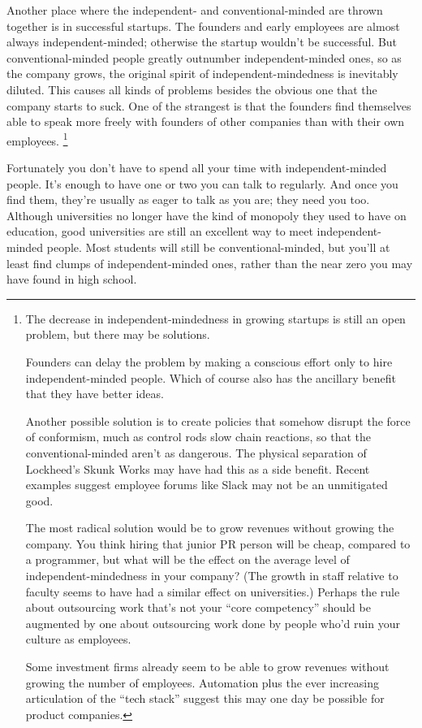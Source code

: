 \documentclass[12pt]{book}
\begin{document}
Another place where the independent- and conventional-minded are thrown
together is in successful startups. The founders and early employees are
almost always independent-minded; otherwise the startup wouldn't be
successful. But conventional-minded people greatly outnumber
independent-minded ones, so as the company grows, the original spirit of
independent-mindedness is inevitably diluted. This causes all kinds of
problems besides the obvious one that the company starts to suck. One of
the strangest is that the founders find themselves able to speak more
freely with founders of other companies than with their own employees.
\footnote{The decrease in independent-mindedness in growing startups is
still an open problem, but there may be solutions.

Founders can delay the problem by making a conscious effort only to hire
independent-minded people. Which of course also has the ancillary
benefit that they have better ideas.

Another possible solution is to create policies that somehow disrupt the
force of conformism, much as control rods slow chain reactions, so that
the conventional-minded aren't as dangerous. The physical separation of
Lockheed's Skunk Works may have had this as a side benefit. Recent
examples suggest employee forums like Slack may not be an unmitigated
good.

The most radical solution would be to grow revenues without growing the
company. You think hiring that junior PR person will be cheap, compared
to a programmer, but what will be the effect on the average level of
independent-mindedness in your company? (The growth in staff relative to
faculty seems to have had a similar effect on universities.) Perhaps the
rule about outsourcing work that's not your ``core competency'' should
be augmented by one about outsourcing work done by people who'd ruin
your culture as employees.

Some investment firms already seem to be able to grow revenues without
growing the number of employees. Automation plus the ever increasing
articulation of the ``tech stack'' suggest this may one day be possible
for product companies.}

Fortunately you don't have to spend all your time with
independent-minded people. It's enough to have one or two you can talk
to regularly. And once you find them, they're usually as eager to talk
as you are; they need you too. Although universities no longer have the
kind of monopoly they used to have on education, good universities are
still an excellent way to meet independent-minded people. Most students
will still be conventional-minded, but you'll at least find clumps of
independent-minded ones, rather than the near zero you may have found in
high school.
\end{document}
